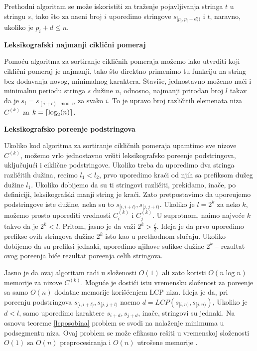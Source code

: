 Prethodni algoritam se mo\v ze iskoristiti za tra\v zenje pojavljivanja stringa $t$ u stringu $s$, tako \v sto za na\dj eni broj $i$ uporedimo stringove $s_{[p_i, p_i + d))}$ i $t$, naravno, ukoliko je $p_i + d \leq n$.

\noindent
\begin{minipage}[l]{\textwidth}

\end{minipage}

\noindent
\textbf{Leksikografski najmanji cikli\v cni pomeraj}

Pomo\' cu algoritma za sortiranje cikli\v cnih pomeraja mo\v zemo lako utvrditi koji cikli\v cni pomeraj je najmanji, tako \v sto direktno primenimo tu funkciju na string bez dodavanja novog, minimalnog karaktera. \v Stavi\v se, jednostavno mo\v zemo na\' ci i minimalnu periodu stringa $s$ du\v zine $n$, odnosno, najmanji prirodan broj $l$ takav da je $s_i = s_{(i+l) \mod n}$ za svako $i$. To je upravo broj razli\v citih elemenata niza $C^{(k)}$ za $k = \left \lceil \log_2(n) \right \rceil$.

\noindent
\textbf{Leksikografsko pore\dj enje podstringova}

Ukoliko kod algoritma za sortiranje cikli\v cnih pomeraja upamtimo sve nizove $C^{(k)}$, mo\v zemo vrlo jednostavno vr\v siti leksikografsko pore\dj enje podstringova, uklju\v cuju\' ci i cikli\v cne podstringove. Ukoliko treba da uporedimo dva stringa razli\v citih du\v zina, recimo $l_1 < l_2$, prvo uporedimo kra\' ci od njih sa prefiksom du\v zeg du\v zine $l_1$. Ukoliko dobijemo da su ti stringovi razli\v citi, prekidamo, ina\v ce, po definiciji, leksikografski manji string je kra\' ci. Zato pretpostavimo da upore\dj ujemo podstringove iste du\v zine, neka su to $s_{[i, i+l)}, s_{[j, j+l)}$.  Ukoliko je $l = 2^k$ za neko $k$, mo\v zemo prosto uporediti vrednosti $C^{(k)}_i$ i $C^{(k)}_j$. U suprotnom, na\dj imo najve\' ce $k$ takvo da je $2^k < l$. Pritom, jasno je da va\v zi $2^k > \frac{l}{2}$. Ideja je da prvo uporedimo prefikse ovih stringova du\v zine $2^k$ isto kao u prethodnom slu\v caju. Ukoliko dobijemo da su prefiksi jednaki, uporedimo njihove sufikse du\v zine $2^k$ -- rezultat ovog pore\dj enja bi\' ce rezultat pore\dj enja celih stringova.

Jasno je da ovaj algoritam radi u slo\v zenosti $O(1)$ ali zato koristi $O(n \log n)$ memorije za nizove $C^{(k)}$. Mogu\' ce je dosti\' ci istu vremensku slo\v zenost za pore\dj enje sa samo $O(n)$ dodatne memorije kori\v s\' cenjem LCP niza. Ideja je da, pri pore\dj enju podstringova $s_{[i, i+l)}, s_{[j, j+l)}$ na\dj emo $d = LCP(s_{[i, n)}, s_{[j, n)})$, Ukoliko je $d < l$, samo uporedimo karaktere $s_{i+d}, s_{j+d}$, ina\v ce, stringovi su jednaki. Na osnovu teoreme \ref{lcposobina} problem se svodi na nala\v zenje minimuma u podsegmentu niza. Ovaj problem se mo\v ze efikasno re\v siti u vremenskoj slo\v zenosti $O(1)$ sa $O(n)$ preprocesiranja i $O(n)$ utro\v sene memorije \cite{lcarmqrad}.

